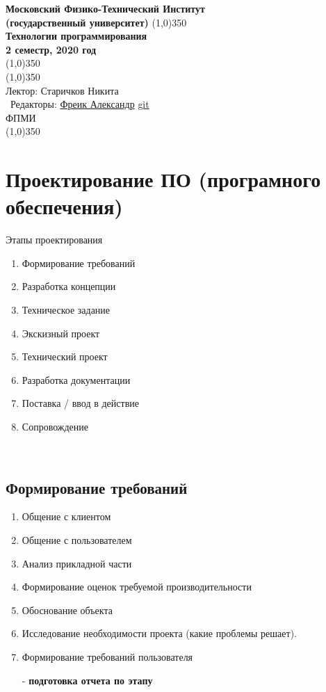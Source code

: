 \documentclass[12pt; a4paper]{article}
\begin{document}
 
\begin{titlepage}
\begin{center}
\large\textbf{Московский Физико-Технический Институт}\\
\large\textbf{(государственный университет)}
\vfill
\line(1,0){350}\\[2mm]
\huge\textbf{Технологии программирования\\ 2 семестр, 2020 год}\\
\line(1,0){350}\\[2mm]
\vfill
\line(1,0){350}\\[1mm]
{\normalsize Лектор: Старичков Никита\\\
Редакторы:  \href{https://vk.com/akira33333}{Фреик Александр} \href{https://github.com/Falier77777}{git}}\\
\large ФПМИ\\
\line(1,0){350}\\[1mm]
\end{center}
\end{titlepage}
\newpage
{}
\section{Проектирование ПО (програмного обеспечения)}
Этапы проектирования
\begin{enumerate}
\item Формирование требований
\item Разработка концепции
\item Техническое задание
\item Экскизный проект
\item Технический проект
\item Разработка документации
\item Поставка / ввод в действие
\item Сопровождение
\end{enumerate}\

\subsection{Формирование требований}
\begin{enumerate}
\item Общение с клиентом
\item Общение с пользователем
\item Анализ прикладной части
\item Формирование оценок требуемой производительности
\item Обоснование объекта
\item Исследование необходимости проекта (какие проблемы решает).
\item Формирование требований пользователя
\item[-] \textbf{подготовка отчета по этапу}
\end{enumerate}
\end{document}
